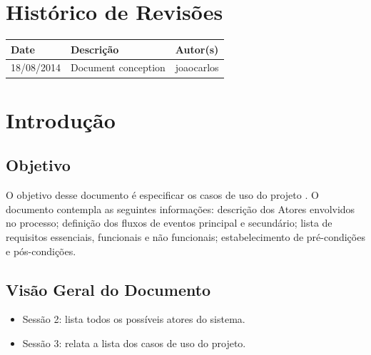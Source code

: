 \documentclass{article}
\begin{document}

\capa
\newpage

\section*{\center Histórico de Revisões}
  \vspace*{1cm}
  \begin{table}[ht]
    \centering
    \begin{tabular}[pos]{|m{2cm} | m{7.2cm} | m{3.8cm}|} 
      \hline
      \cellcolor[gray]{0.9}
      \textbf{Date} & \cellcolor[gray]{0.9}\textbf{Descrição} & \cellcolor[gray]{0.9}\textbf{Autor(s)}\\ \hline
      \small 18/08/2014 & \small Document conception & \small joaocarlos \\ \hline      
    \end{tabular}
  \end{table}

\newpage

\tableofcontents
\newpage

\section{Introdução}

  \subsection{Objetivo}
  O objetivo desse documento é especificar os casos de uso do projeto \ipPROCESSProject. O documento contempla as seguintes informações: descrição dos Atores envolvidos no processo; definição dos fluxos de eventos principal e secundário; lista de requisitos essenciais, funcionais e não funcionais; estabelecimento de pré-condições e pós-condições.

  \subsection{Visão Geral do Documento}
  \begin{itemize}
    \item Sessão 2: lista todos os possíveis atores do sistema.
    \item Sessão 3: relata a lista dos casos de uso do projeto.
  \end{itemize}
  
\end{document}
